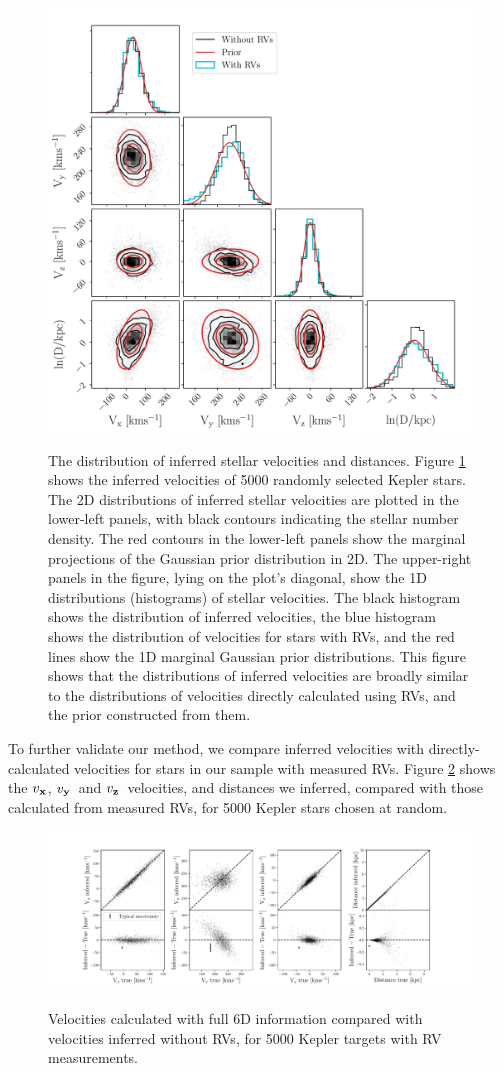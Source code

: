 \documentclass[]{aastex631}
\newcommand{\vx}{$v_{\bf x}$}
\newcommand{\vy}{$v_{\bf y}$}
\newcommand{\vz}{$v_{\bf z}$}
\begin{document}
\begin{figure}[ht!]
\caption{
The distribution of inferred stellar velocities and distances.
    Figure \ref{fig:results} shows the inferred velocities of 5000 randomly
selected Kepler stars.
The 2D distributions of inferred stellar velocities are plotted in the
lower-left panels, with black contours indicating the stellar number density.
The red contours in the lower-left panels show the marginal projections of
    the Gaussian prior distribution in 2D.
The upper-right panels in the figure, lying on the plot's diagonal, show the
    1D distributions (histograms) of stellar velocities.
The black histogram shows the distribution of inferred velocities, the blue
histogram shows the distribution of velocities for stars with RVs,
and the red lines show the 1D marginal Gaussian prior distributions.
This figure shows that the distributions of inferred velocities are
    broadly similar to the distributions of velocities directly calculated
    using RVs, and the prior constructed from them.
}
  \centering
    \includegraphics[width=.7\textwidth]{results_figure}
\label{fig:results}
\end{figure}
To further validate our method, we compare inferred velocities with
directly-calculated velocities for stars in our sample with measured RVs.
Figure \ref{fig:residuals} shows the \vx, \vy\ and \vz\ velocities, and
distances we inferred, compared with those calculated from measured RVs, for
5000 Kepler stars chosen at random.
\begin{figure}[ht!]
\caption{Velocities calculated with full 6D information compared with
    velocities inferred without RVs, for 5000 Kepler targets with RV
    measurements.}
  \centering
    \includegraphics[width=1\textwidth]{residuals}
\label{fig:residuals}
\end{figure}
\end{document}

